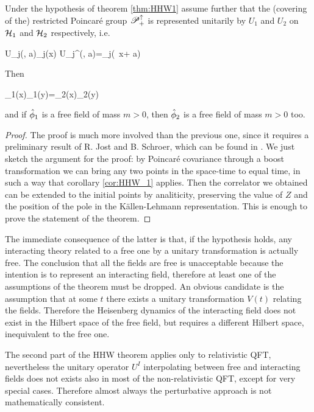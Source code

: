 \documentclass[../main/main.tex]{subfiles}
\begin{document}
\begin{theorem}\label{thm:HHW2}
	Under the hypothesis of theorem \ref{thm:HHW1} assume further that the (covering of the) restricted Poincaré group $\mathscr P_+^\uparrow$ is represented unitarily by $U_1$ and $U_2$ on $\mathcal H_1$ and $\mathcal H_2$ respectively, i.e.
	\begin{eq}
		U_j(\Lambda, a)\ophi_j(x) U_j^\dagger(\Lambda, a)=\ophi_j(\Lambda\, x+ a)
	\end{eq}
	Then
	\begin{eq}
		\ophi_1(x)\ophi_1(y)=\ophi_2(x)\ophi_2(y)\ket{0_2}
	\end{eq}
	and if $\hat{\phi}_1$ is a free field of mass $m>0$, then $\hat{\phi}_2$ is a free field of mass $m>0$ too.
\end{theorem}
\begin{proof}
	The proof is much more involved than the previous one, since it requires a preliminary result of R. Jost and B. Schroer, which can be found in \cite[Thm. 4.15]{Streater:2000}. We just sketch the argument for the proof: by Poincaré covariance through a boost transformation we can bring any two points in the space-time to equal time, in such a way that corollary \ref{cor:HHW_1} applies. Then the correlator we obtained can be extended to the initial points by analiticity, preserving the value of $Z$ and the position of the pole in the Källen-Lehmann representation. This is enough to prove the statement of the theorem.  
\end{proof}

The immediate consequence of the latter is that, if the hypothesis holds, any interacting theory related to a free one by a unitary transformation is actually free. The conclusion that all the fields are free is unacceptable because the intention is to represent an interacting field, therefore at least one of the assumptions of the theorem must be dropped. An obvious candidate is the assumption that at some $t$ there exists a unitary transformation $V(t)$ relating the fields. Therefore the Heisenberg dynamics of the interacting field does not exist in the Hilbert space of the free field, but requires a different Hilbert space, inequivalent to the free one.  


The second part of the HHW theorem applies only to relativistic QFT, nevertheless the unitary operator $U^I$ interpolating between free and interacting fields does not exists also in most of the non-relativistic QFT, except for very special cases. Therefore almost always the perturbative approach is not mathematically consistent. 
\end{document}
